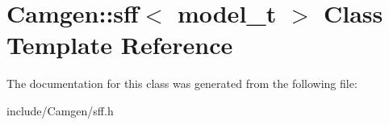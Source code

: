 \hypertarget{a00504}{}\section{Camgen\+:\+:sff$<$ model\+\_\+t $>$ Class Template Reference}
\label{a00504}


The documentation for this class was generated from the following file\+:\begin{DoxyCompactItemize}
\item 
include/\+Camgen/sff.\+h\end{DoxyCompactItemize}

